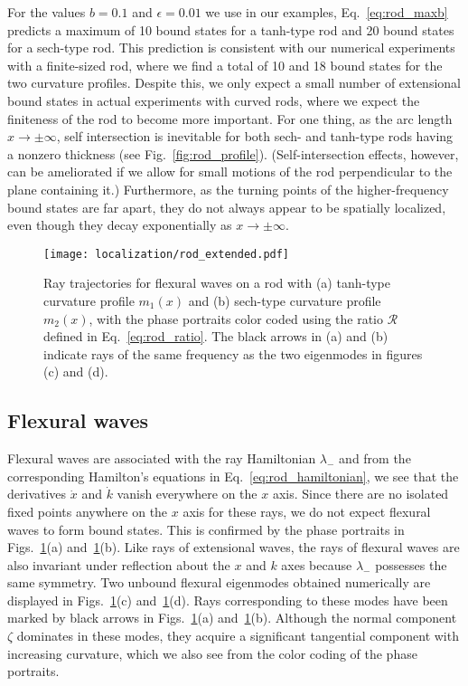 For the values $b = 0.1$ and $\epsilon = 0.01$ we use in our examples, Eq.~\eqref{eq:rod_maxb} predicts a maximum of 10 bound states for a tanh-type rod and 20 bound states for a sech-type rod.
This prediction is consistent with our numerical experiments with a finite-sized rod, where we find a total of 10 and 18 bound states for the two curvature profiles.
Despite this, we only expect a small number of extensional bound states in actual experiments with curved rods, where we expect the finiteness of the rod to become more important.
For one thing, as the arc length $x \to \pm\infty$, self intersection is inevitable for both sech- and tanh-type rods having a nonzero thickness (see Fig.~\ref{fig:rod_profile}).
(Self-intersection effects, however, can be ameliorated if we allow for small motions of the rod perpendicular to the plane containing it.)
Furthermore, as the turning points of the higher-frequency bound states are far apart, they do not always appear to be spatially localized, even though they decay exponentially as $x \to \pm\infty$.
%
\begin{figure}
  \begin{center}
    \texttt{[image: localization/rod\_extended.pdf]}
  \end{center}
  \caption{%
    Ray trajectories for flexural waves on a rod with (a) tanh-type curvature profile $m_{1}(x)$ and (b) sech-type curvature profile $m_{2}(x)$, with the phase portraits color coded using the ratio $\mathscr{R}$ defined in Eq.~\eqref{eq:rod_ratio}.
    The black arrows in (a) and (b) indicate rays of the same frequency as the two eigenmodes in figures (c) and (d).
  }
  \label{fig:rod_extended}
\end{figure}

\subsection{Flexural waves}

Flexural waves are associated with the ray Hamiltonian $\lambda_{-}$ and from the corresponding Hamilton's equations in Eq.~\eqref{eq:rod_hamiltonian}, we see that the derivatives $\dot{x}$ and $\dot{k}$ vanish everywhere on the $x$ axis.
Since there are no isolated fixed points anywhere on the $x$ axis for these rays, we do not expect flexural waves to form bound states.
This is confirmed by the phase portraits in Figs.~\ref{fig:rod_extended}(a) and~\ref{fig:rod_extended}(b).
Like rays of extensional waves, the rays of flexural waves are also invariant under reflection about the $x$ and $k$ axes because $\lambda_{-}$ possesses the same symmetry.
Two unbound flexural eigenmodes obtained numerically are displayed in Figs.~\ref{fig:rod_extended}(c) and~\ref{fig:rod_extended}(d).
Rays corresponding to these modes have been marked by black arrows in Figs.~\ref{fig:rod_extended}(a) and~\ref{fig:rod_extended}(b).
Although the normal component $\zeta$ dominates in these modes, they acquire a significant tangential component with increasing curvature, which we also see from the color coding of the phase portraits.

